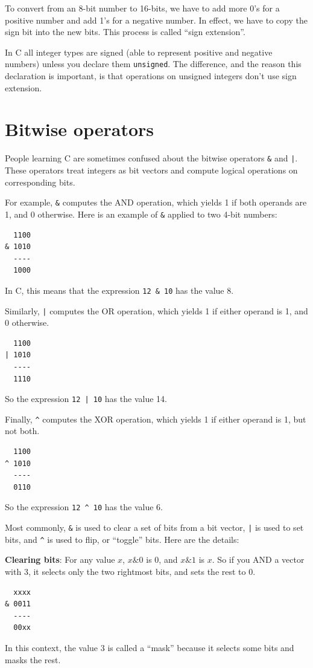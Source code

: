 \documentclass[12pt]{book}
\begin{document}
{To convert from an 8-bit number to 16-bits, we have to add
more 0's for a positive number and add 1's for a negative number.
In effect, we have to copy the sign bit into the new bits.
This process is called ``sign extension''.

In C all integer types are signed (able to represent positive and
negative numbers) unless you declare them {\tt unsigned}.  The
difference, and the reason this declaration is important, is that
operations on unsigned integers don't use sign extension.


\section{Bitwise operators}

People learning C are sometimes confused
about the bitwise operators \verb"&" and \verb"|".  These
operators treat integers as bit vectors and compute logical
operations on corresponding bits.

For example, \verb"&" computes the AND operation, which yields
1 if both operands are 1, and 0 otherwise.  Here is an example
of \verb"&" applied to two 4-bit numbers:
%
\begin{verbatim}
  1100
& 1010
  ----
  1000
\end{verbatim}
%
In C, this means that the expression \verb"12 & 10" has the
value 8.

Similarly, \verb"|" computes the OR operation, which yields
1 if either operand is 1, and 0 otherwise.
%
\begin{verbatim}
  1100
| 1010
  ----
  1110
\end{verbatim}
%
So the expression \verb"12 | 10" has the value 14.

Finally, \verb"^" computes the XOR operation, which yields
1 if either operand is 1, but not both.
%
\begin{verbatim}
  1100
^ 1010
  ----
  0110
\end{verbatim}
%
So the expression \verb"12 ^ 10" has the value 6.

Most commonly, \verb"&" is used to clear a set of bits from
a bit vector, \verb"|" is used to set bits, and \verb"^"
is used to flip, or ``toggle'' bits.  Here are the details:

{\bf Clearing bits}: For any value $x$, $x \& 0$ is 0, and $x \& 1$ is $x$.
So if you AND a vector with 3, it 
selects only the two rightmost bits, and sets the rest to 0.
%
\begin{verbatim}
  xxxx
& 0011
  ----
  00xx
\end{verbatim}
%
In this context, the value 3 is called a ``mask'' because it
selects some bits and masks the rest.

}
\end{document}
